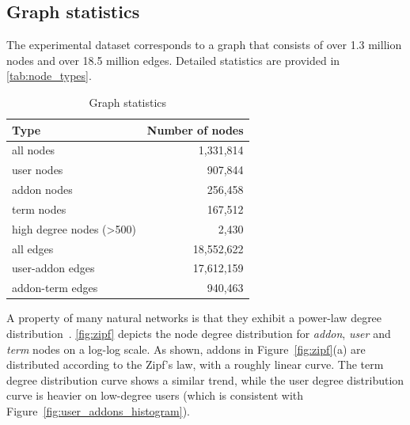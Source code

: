 \documentclass[ijoc,nonblindrev]{informs3} %
\numberwithin{equation}{subsection}
\begin{document}
\subsection{Graph statistics}

The experimental dataset corresponds to a graph that consists of over 1.3 million nodes and over 18.5 million edges. Detailed statistics are provided in \autoref{tab:node_types}.

\begin{table}[H]
\centering
\begin{small}
\begin{tabular}{|l|r|}
\hline
\textbf{Type}                                                                & \textbf{Number of nodes} \\ \hline
all nodes                                                                    & 1,331,814         \\ \hline
user nodes                                                                   & 907,844          \\ \hline
addon nodes                                                                  & 256,458          \\ \hline
term nodes                                                                   & 167,512          \\ \hline
high degree nodes (\textgreater500)                                          & 2,430            \\ \hline
all edges                                                                    & 18,552,622        \\ \hline
user-addon edges                                                             & 17,612,159        \\ \hline
addon-term edges                                                             & 940,463          \\ \hline
\end{tabular}
\end{small}
\caption{Graph statistics}
\label{tab:node_types}
\end{table}

A property of many natural networks is that they exhibit a power-law degree distribution~\citep{albert1999internet}. \autoref{fig:zipf} depicts the node degree distribution for {\it addon}, {\it user} and {\it term} nodes on a log-log scale. As shown, addons in Figure~\ref{fig:zipf}(a) are distributed according to the Zipf's law, with a roughly linear curve. The term degree distribution curve shows a similar trend, while the user degree distribution curve is heavier on low-degree users (which is consistent with Figure~\ref{fig:user_addons_histogram}).
\end{document}
